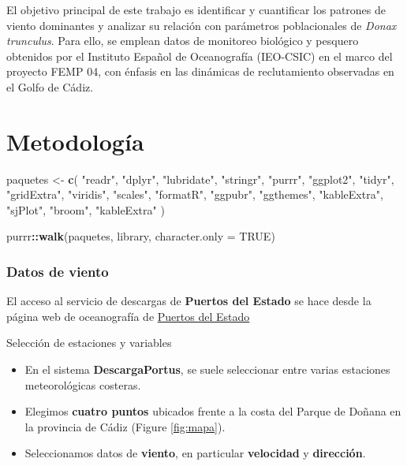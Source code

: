 \documentclass[
]{article}
\newenvironment{Shaded}{\begin{snugshade}}{\end{snugshade}}
\newcommand{\AttributeTok}[1]{\textcolor[rgb]{0.13,0.29,0.53}{#1}}
\newcommand{\ConstantTok}[1]{\textcolor[rgb]{0.56,0.35,0.01}{#1}}
\newcommand{\FunctionTok}[1]{\textcolor[rgb]{0.13,0.29,0.53}{\textbf{#1}}}
\newcommand{\NormalTok}[1]{#1}
\newcommand{\OtherTok}[1]{\textcolor[rgb]{0.56,0.35,0.01}{#1}}
\newcommand{\SpecialCharTok}[1]{\textcolor[rgb]{0.81,0.36,0.00}{\textbf{#1}}}
\newcommand{\StringTok}[1]{\textcolor[rgb]{0.31,0.60,0.02}{#1}}
\providecommand{\tightlist}{%
  \setlength{\itemsep}{0pt}\setlength{\parskip}{0pt}}
\begin{document}
El objetivo principal de este trabajo es identificar y cuantificar los patrones de viento dominantes y analizar su relación con parámetros poblacionales de \emph{Donax trunculus}. Para ello, se emplean datos de monitoreo biológico y pesquero obtenidos por el Instituto Español de Oceanografía (IEO-CSIC) en el marco del proyecto FEMP 04, con énfasis en las dinámicas de reclutamiento observadas en el Golfo de Cádiz.

\newpage

\section{Metodología}\label{metodologuxeda}

\begin{Shaded}
\begin{Highlighting}[]
\NormalTok{paquetes }\OtherTok{\textless{}{-}} \FunctionTok{c}\NormalTok{(}
  \StringTok{"readr"}\NormalTok{, }\StringTok{"dplyr"}\NormalTok{, }\StringTok{"lubridate"}\NormalTok{, }\StringTok{"stringr"}\NormalTok{, }\StringTok{"purrr"}\NormalTok{,}
  \StringTok{"ggplot2"}\NormalTok{, }\StringTok{"tidyr"}\NormalTok{, }\StringTok{"gridExtra"}\NormalTok{, }\StringTok{"viridis"}\NormalTok{, }\StringTok{"scales"}\NormalTok{,}
  \StringTok{"formatR"}\NormalTok{, }\StringTok{"ggpubr"}\NormalTok{, }\StringTok{"ggthemes"}\NormalTok{, }\StringTok{"kableExtra"}\NormalTok{, }\StringTok{"sjPlot"}\NormalTok{, }
  \StringTok{"broom"}\NormalTok{, }\StringTok{"kableExtra"}
\NormalTok{  )}

\NormalTok{purrr}\SpecialCharTok{::}\FunctionTok{walk}\NormalTok{(paquetes, library, }\AttributeTok{character.only =} \ConstantTok{TRUE}\NormalTok{)}
\end{Highlighting}
\end{Shaded}

\subsubsection{Datos de viento}\label{datos-de-viento}

El acceso al servicio de descargas de \textbf{Puertos del Estado} se hace desde la página web de oceanografía de \href{http://www.puertos.es/es-es/oceanografia/Paginas/portus.aspx}{Puertos del Estado}

Selección de estaciones y variables

\begin{itemize}
\tightlist
\item
  En el sistema \textbf{DescargaPortus}, se suele seleccionar entre varias estaciones meteorológicas costeras.
\item
  Elegimos \textbf{cuatro puntos} ubicados frente a la costa del Parque de Doñana en la provincia de Cádiz (Figure \ref{fig:mapa}).
\item
  Seleccionamos datos de \textbf{viento}, en particular \textbf{velocidad} y \textbf{dirección}.
\end{itemize}
\end{document}

